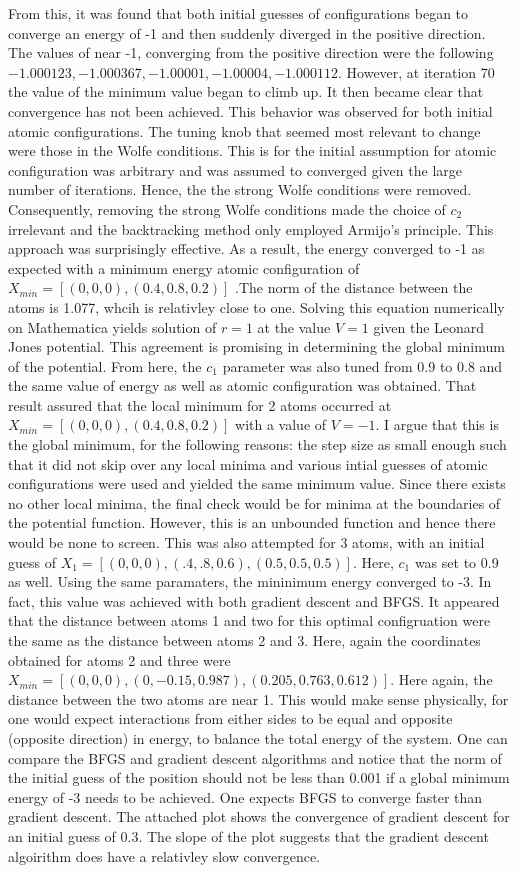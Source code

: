 \documentclass{article}
\begin{document}
  From this, it was found that both  initial guesses of configurations began to converge an energy of -1 and then suddenly diverged in the positive direction. The values of near -1, converging from the positive direction were the following $-1.000123, -1.000367, -1.00001, -1.00004, -1.000112$. However, at iteration 70 the value of the minimum value began to climb up.   It then became clear that convergence has not been achieved.  This behavior was observed for both initial atomic configurations. The tuning knob that seemed most relevant to change were those in the Wolfe conditions. This is for the initial assumption for atomic configuration was arbitrary and was assumed to converged given the large number of iterations. Hence, the the strong Wolfe conditions were removed. Consequently, removing the strong Wolfe conditions made the choice of $c_{2}$ irrelevant and the backtracking method only employed Armijo's principle. This approach was surprisingly effective.  As a result, the energy converged to  -1 as expected with a minimum energy atomic configuration of $X_{min}= [(0,0,0), (0.4,  0.8, 0.2)]$ .The norm of the distance between the atoms is 1.077, whcih is relativley close to one. Solving this equation numerically on Mathematica yields solution of $r=1$ at the value $V=1$ given the Leonard Jones potential. This agreement is promising in determining the global minimum of the potential. From here, the $c_{1}$ parameter was also tuned  from 0.9 to 0.8 and the same value of energy as well as atomic configuration was obtained. That result assured that the local minimum for 2 atoms occurred at $X_{min}= [(0,0,0), (0.4,  0.8, 0.2)]$ with a value of $V=-1$. I argue that this is the global minimum, for the following reasons: the step size as small enough such that it did not skip over any local minima and various intial guesses of atomic configurations were used and yielded the same minimum value. Since there exists no other local minima, the final check would be for minima at the boundaries of the potential function. However, this is an unbounded function and hence there would be none to screen. This was also attempted for 3 atoms, with an initial guess of $ X_{1}=[(0,0,0), (.4,.8,0.6), (0.5,0.5,0.5) ] $. Here, $c_{1}$ was set to 0.9 as well. Using the same paramaters, the mininimum energy converged to -3. In fact, this value was achieved with both gradient descent and BFGS.  It appeared that the distance between atoms 1 and two for this optimal configruation were the same as the distance between atoms 2 and 3. Here, again the coordinates obtained for atoms 2 and three were $X_{min} =[(0,0,0),(0,-0.15,0.987), (0.205,  0.763, 0.612)] $. Here again, the distance between the two atoms are near 1. This would make sense physically, for one would expect  interactions from either sides to be  equal and opposite (opposite direction) in energy, to balance the total energy of the system. One can compare the BFGS and gradient descent algorithms and notice that the norm of the initial guess of the position should not be less than 0.001 if a global minimum energy of -3 needs to be achieved. One expects BFGS to converge faster than gradient descent. The attached plot shows the convergence of gradient descent for an initial guess of 0.3.  The slope of the plot suggests that the gradient descent algoirithm does have a relativley slow convergence. 
 
 
 
 
\end{document}
